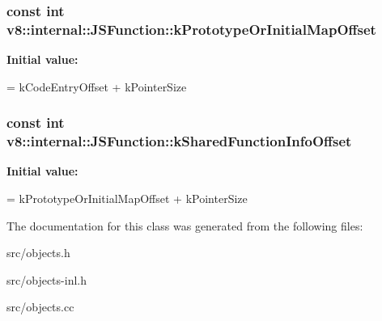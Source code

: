 \subsubsection[{k\+Prototype\+Or\+Initial\+Map\+Offset}]{\setlength{\rightskip}{0pt plus 5cm}const int v8\+::internal\+::\+J\+S\+Function\+::k\+Prototype\+Or\+Initial\+Map\+Offset\hspace{0.3cm}{\ttfamily [static]}}\label{classv8_1_1internal_1_1_j_s_function_afeab7ef9302f5f8506f76661d07b0a88}
{\bfseries Initial value\+:}
\begin{DoxyCode}
=
      kCodeEntryOffset + kPointerSize
\end{DoxyCode}
\hypertarget{classv8_1_1internal_1_1_j_s_function_aad0f7708bd719c7d19f45468d23e8ccd}{}
\subsubsection[{k\+Shared\+Function\+Info\+Offset}]{\setlength{\rightskip}{0pt plus 5cm}const int v8\+::internal\+::\+J\+S\+Function\+::k\+Shared\+Function\+Info\+Offset\hspace{0.3cm}{\ttfamily [static]}}\label{classv8_1_1internal_1_1_j_s_function_aad0f7708bd719c7d19f45468d23e8ccd}
{\bfseries Initial value\+:}
\begin{DoxyCode}
=
      kPrototypeOrInitialMapOffset + kPointerSize
\end{DoxyCode}


The documentation for this class was generated from the following files\+:\begin{DoxyCompactItemize}
\item 
src/objects.\+h\item 
src/objects-\/inl.\+h\item 
src/objects.\+cc\end{DoxyCompactItemize}
